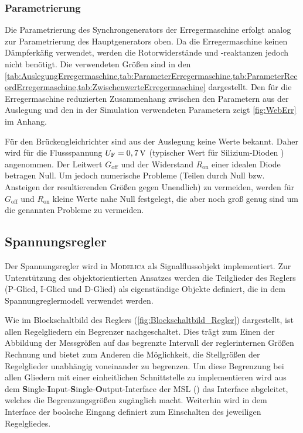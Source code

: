 
\hypertarget{parametrierung-2}{%
\subsubsection{Parametrierung}\label{parametrierung-2}}

Die Parametrierung des Synchrongenerators der Erregermaschine erfolgt analog zur Parametrierung des Hauptgenerators oben. Da die Erregermaschine keinen Dämpferkäfig verwendet, werden die Rotorwiderstände und -reaktanzen jedoch nicht benötigt. Die verwendeten Größen sind in den  \cref{tab:AuslegungErregermaschine,tab:ParameterErregermaschine,tab:ParameterRecordErregermaschine,tab:ZwischenwerteErregermaschine} dargestellt. Den für die Erregermaschine reduzierten Zusammenhang zwischen den Parametern aus der Auslegung und den in der Simulation verwendeten Parametern zeigt \cref{fig:WebErr} im Anhang.

Für den Brückengleichrichter sind aus der Auslegung keine Werte bekannt. Daher wird für die Flussspannung \(U_{\mathrm{F}}=\unit[0,7]{V}\) (typischer Wert für Silizium-Dioden \cite[S.~23]{Tietze:1993tw} ) angenommen. Der Leitwert \(G_{\mathrm{off}}\) und der Widerstand \(R_{\mathrm{on}}\) einer idealen Diode betragen Null. Um jedoch numerische Probleme (Teilen durch Null bzw. Ansteigen der resultierenden Größen gegen Unendlich) zu vermeiden, werden für \(G_{\mathrm{off}}\) und \(R_{\mathrm{on}}\) kleine Werte nahe Null festgelegt, die aber noch groß genug sind um die genannten Probleme zu vermeiden.

\subsection{Spannungsregler}\label{sec:Spannungsregler}
Der Spannungsregler wird in \textsc{Modelica} als Signalflussobjekt implementiert. Zur Unterstützung des objektorientierten Ansatzes werden die Teilglieder des Reglers (P-Glied, I-Glied und D-Glied) als eigenständige Objekte definiert, die in dem Spannungreglermodell verwendet werden.

Wie im Blockschaltbild des Reglers (\cref{fig:Blockschaltbild_Regler}) dargestellt, ist allen Regelgliedern ein Begrenzer nachgeschaltet. Dies trägt zum Einen der Abbildung der Messgrößen auf das begrenzte Intervall der reglerinternen Größen Rechnung und bietet zum Anderen die Möglichkeit, die Stellgrößen der Regelglieder unabhängig voneinander zu begrenzen. Um diese Begrenzung bei allen Gliedern mit einer einheitlichen Schnittstelle zu implementieren wird aus dem \textbf{S}ingle-\textbf{I}nput-\textbf{S}ingle-\textbf{O}utput-Interface der MSL () das Interface  abgeleitet, welches die Begrenzungsgrößen zugänglich macht. Weiterhin wird in dem Interface der boolsche Eingang  definiert zum Einschalten des jeweiligen Regelgliedes.­

